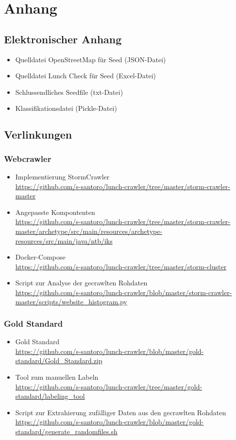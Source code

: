 \chapter{Anhang}
\section{Elektronischer Anhang}
\begin{itemize}
	\item Quelldatei OpenStreetMap für Seed (JSON-Datei)
	\item Quelldatei Lunch Check für Seed (Excel-Datei)
	\item Schlussendliches Seedfile (txt-Datei)
	\item Klassifikationsdatei (Pickle-Datei)
\end{itemize}
\section{Verlinkungen}
\subsection{Webcrawler}
\begin{itemize}
	\item Implementierung StormCrawler\\ \url{https://github.com/s-santoro/lunch-crawler/tree/master/storm-crawler-master}
	\item Angepasste Kompontenten\\
	\url{https://github.com/s-santoro/lunch-crawler/tree/master/storm-crawler-master/archetype/src/main/resources/archetype-resources/src/main/java/ntb/iks}
	\item Docker-Compose\\
	\url{https://github.com/s-santoro/lunch-crawler/tree/master/storm-cluster}
	\item Script zur Analyse der gecrawlten Rohdaten\\
	\url{https://github.com/s-santoro/lunch-crawler/blob/master/storm-crawler-master/scripts/website_histogram.py}
\end{itemize} 
\subsection{Gold Standard}
\label{app:gold_standard}
\begin{itemize}
	\item Gold Standard\\ 
	\url{https://github.com/s-santoro/lunch-crawler/blob/master/gold-standard/Gold_Standard.zip}
	\item Tool zum manuellen Labeln\\ 
	\url{https://github.com/s-santoro/lunch-crawler/tree/master/gold-standard/labeling_tool}
	\item Script zur Extrahierung zufälliger Daten aus den gecrawlten Rohdaten\\ 
	\url{https://github.com/s-santoro/lunch-crawler/blob/master/gold-standard/generate_randomfiles.sh}
\end{itemize} 

